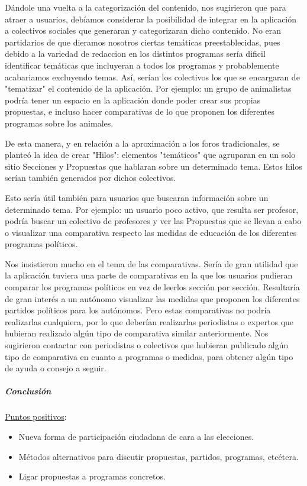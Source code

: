Dándole una vuelta a la categorización del contenido, nos sugirieron que para atraer a usuarios, debíamos considerar la posibilidad de integrar en la aplicación a colectivos sociales que generaran y categorizaran dicho contenido. No eran partidarios de que dieramos nosotros ciertas temáticas preestablecidas, pues debido a la variedad de redaccion en los distintos programas sería dificil identificar temáticas que incluyeran a todos los programas y probablemente acabariamos excluyendo temas. Así, serían los colectivos los que se encargaran de "tematizar" el contenido de la aplicación. Por ejemplo: un grupo de animalistas podría tener un espacio en la aplicación donde poder crear sus propias propuestas, e incluso hacer comparativas de lo que proponen los diferentes programas sobre los animales. 

De esta manera, y en relación a la aproximación a los foros tradicionales, se planteó la idea de crear "Hilos": elementos "temáticos" que agruparan en un solo sitio Secciones y Propuestas que hablaran sobre un determinado tema. Estos hilos serían también generados por dichos colectivos.

Esto sería útil también para usuarios que buscaran información sobre un determinado tema. Por ejemplo: un usuario poco activo, que resulta ser profesor, podría buscar un colectivo de profesores y ver las Propuestas que se llevan a cabo o visualizar una comparativa respecto las medidas de educación de los diferentes programas políticos.

Nos insistieron mucho en el tema de las comparativas. Sería de gran utilidad que la aplicación tuviera una parte de comparativas en la que los usuarios pudieran comparar los programas políticos en vez de leerlos sección por sección. Resultaría de gran interés a un autónomo visualizar las medidas que proponen los diferentes partidos políticos para los autónomos. Pero estas comparativas no podría realizarlas cualquiera, por lo que deberían realizarlas periodistas o expertos que hubieran realizado algún tipo de comparativa similar anteriormente. Nos sugirieron contactar con periodistas o colectivos que hubieran publicado algún tipo de comparativa en cuanto a programas o medidas, para obtener algún tipo de ayuda o consejo a seguir.

\subparagraph{Conclusión}

\underline{Puntos positivos}:

\begin{itemize}
 \item Nueva forma de participación ciudadana de cara a las elecciones.
 \item Métodos alternativos para discutir propuestas, partidos, programas, etcétera.
 \item Ligar propuestas a programas concretos.
\end{itemize}

